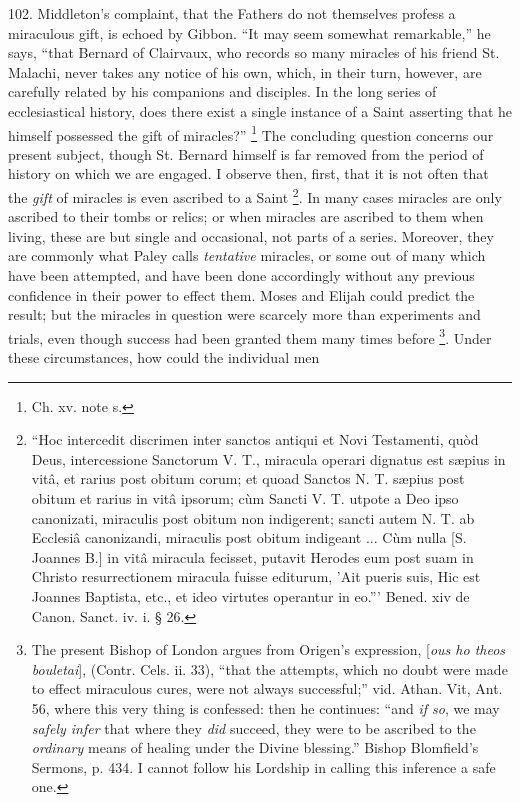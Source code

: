 102.
Middleton's complaint, that the Fathers do not themselves profess a
miraculous gift, is echoed by Gibbon. ``It may seem somewhat
remarkable,'' he says, ``that Bernard of Clairvaux, who records so many
miracles of his friend St. Malachi, never takes any notice of his own,
which, in their turn, however, are carefully related by his companions
and disciples. In the long series of ecclesiastical history, does
there exist a single instance of a Saint asserting that he himself
possessed the gift of miracles?'' \footnote{Ch. xv. note s.} The concluding question concerns our present subject,
though St. Bernard himself is far removed from the period of history
on which we are engaged. I observe then, first, that it is not often
that the \emph{gift} of miracles is even ascribed to a Saint \footnote{``Hoc intercedit discrimen inter sanctos antiqui et Novi Testamenti, quòd
Deus, intercessione Sanctorum V. T., miracula operari dignatus est sæpius
in vitâ, et rarius post obitum corum; et quoad Sanctos N. T. sæpius
post obitum et rarius in vitâ ipsorum; cùm Sancti V. T. utpote a Deo
ipso canonizati, miraculis post obitum non indigerent; sancti autem N.
T. ab Ecclesiâ canonizandi, miraculis post obitum indigeant ... Cùm
nulla [S. Joannes B.] in vitâ miracula fecisset, putavit Herodes eum
post suam in Christo resurrectionem miracula fuisse editurum, 'Ait
pueris suis, Hic est Joannes Baptista, etc., et ideo virtutes
operantur in eo.''' Bened. xiv de Canon. Sanct. iv. i. § 26.}. In many cases miracles are only ascribed to their tombs or
relics; or when miracles are ascribed to them when living, these are
but single and occasional, not parts of a series. Moreover, they are
commonly what Paley calls \emph{tentative} miracles, or some out of
many which have been attempted, and have been done accordingly without
any previous confidence in their power to effect them. Moses and
Elijah could predict the result; but the miracles in question were
scarcely more than experiments and trials, even though success had
been granted them many times before \footnote{The present Bishop of London argues from Origen's expression, [\emph{ous
ho theos bouletai}], (Contr. Cels. ii. 33), ``that the attempts,
which no doubt were made to effect miraculous cures, were not always
successful;'' vid. Athan. Vit, Ant. 56, where this very thing is
confessed: then he continues: ``and \emph{if so}, we may \emph{safely infer}
that where they \emph{did} succeed, they were to be ascribed to the \emph{ordinary}
means of healing under the Divine blessing.'' Bishop Blomfield's
Sermons, p. 434. I cannot follow his Lordship in calling this
inference a safe one.}. Under these circumstances, how could the individual men
